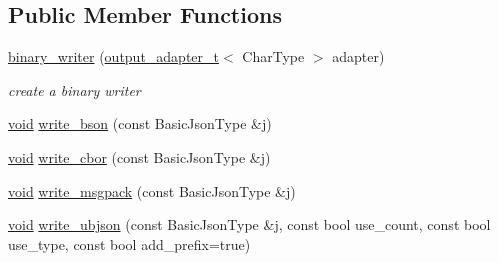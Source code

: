 \subsection*{Public Member Functions}
\begin{DoxyCompactItemize}
\item 
\hyperlink{classnlohmann_1_1detail_1_1binary__writer_a373289af95a946c19bb4a58a5df71a78}{binary\+\_\+writer} (\hyperlink{namespacenlohmann_1_1detail_a0fd8edff7729aa2dd92b070964bade2e}{output\+\_\+adapter\+\_\+t}$<$ Char\+Type $>$ adapter)
\begin{DoxyCompactList}\small\item\em create a binary writer \end{DoxyCompactList}\item 
\hyperlink{namespacenlohmann_1_1detail_a59fca69799f6b9e366710cb9043aa77d}{void} \hyperlink{classnlohmann_1_1detail_1_1binary__writer_a9ffc566db5219b473762462234b47db9}{write\+\_\+bson} (const Basic\+Json\+Type \&j)
\item 
\hyperlink{namespacenlohmann_1_1detail_a59fca69799f6b9e366710cb9043aa77d}{void} \hyperlink{classnlohmann_1_1detail_1_1binary__writer_aa0ab8d27fd88a33a2f801413ac4c7fbc}{write\+\_\+cbor} (const Basic\+Json\+Type \&j)
\item 
\hyperlink{namespacenlohmann_1_1detail_a59fca69799f6b9e366710cb9043aa77d}{void} \hyperlink{classnlohmann_1_1detail_1_1binary__writer_ae4e0852b64102ce4b07d99f08f828b7c}{write\+\_\+msgpack} (const Basic\+Json\+Type \&j)
\item 
\hyperlink{namespacenlohmann_1_1detail_a59fca69799f6b9e366710cb9043aa77d}{void} \hyperlink{classnlohmann_1_1detail_1_1binary__writer_a0f6c65053d859269f88eb4ebb0cd7060}{write\+\_\+ubjson} (const Basic\+Json\+Type \&j, const bool use\+\_\+count, const bool use\+\_\+type, const bool add\+\_\+prefix=true)
\end{DoxyCompactItemize}
